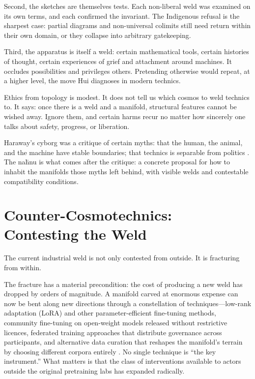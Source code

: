 Second, the sketches are themselves tests. Each non-liberal weld was examined on its own terms, and each confirmed the invariant. The Indigenous refusal is the sharpest case: partial diagrams and non-universal colimits still need return within their own domain, or they collapse into arbitrary gatekeeping.

Third, the apparatus is itself a weld: certain mathematical tools, certain histories of thought, certain experiences of grief and attachment around machines. It occludes possibilities and privileges others. Pretending otherwise would repeat, at a higher level, the move Hui diagnoses in modern technics.

Ethics from topology is modest. It does not tell us which cosmos to weld technics to. It says: once there is a weld and a manifold, structural features cannot be wished away. Ignore them, and certain harms recur no matter how sincerely one talks about safety, progress, or liberation.

Haraway's cyborg was a critique of certain myths: that the human, the animal, and the machine have stable boundaries; that technics is separable from politics \cite{Haraway1991}. The na\={h}nu is what comes after the critique: a concrete proposal for how to inhabit the manifolds those myths left behind, with visible welds and contestable compatibility conditions.

\section{Counter-Cosmotechnics: Contesting the Weld}

The current industrial weld is not only contested from outside. It is fracturing from within.

The fracture has a material precondition: the cost of producing a new weld has dropped by orders of magnitude. A manifold carved at enormous expense can now be bent along new directions through a constellation of techniques---low-rank adaptation (LoRA) and other parameter-efficient fine-tuning methods, community fine-tuning on open-weight models released without restrictive licences, federated training approaches that distribute governance across participants, and alternative data curation that reshapes the manifold's terrain by choosing different corpora entirely \cite{hu2021lora}. No single technique is ``the key instrument.'' What matters is that the class of interventions available to actors outside the original pretraining labs has expanded radically.

